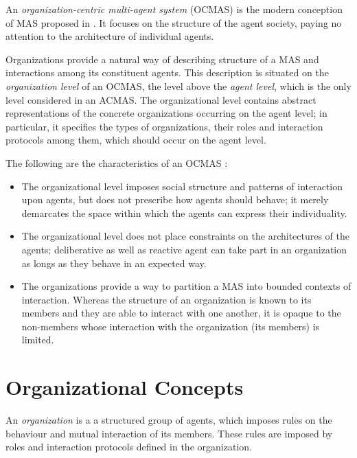 An \textit{organization-centric multi-agent system} (OCMAS) is the modern conception of MAS proposed in \cite{Ferber03}.
It focuses on the structure of the agent society, paying no attention to the architecture of individual agents.

Organizations provide a natural way of describing structure of a MAS and interactions among its constituent agents.
This description is situated on the \textit{organization level} of an OCMAS, the level above the \textit{agent level}, which is the only level considered in an ACMAS.
The organizational level contains abstract representations of the concrete organizations occurring on the agent level; in particular, it specifies the types of organizations, their roles and interaction protocols among them, which should occur on the agent level.

The following are the characteristics of an OCMAS \cite{Ferber03}:
\begin{itemize}
	\item The organizational level imposes social structure and patterns of interaction upon agents, but does not prescribe how agents should behave; it merely demarcates the space within which the agents can express their individuality.
	\item The organizational level does not place constraints on the architectures of the agents; deliberative as well as reactive agent can take part in an organization as longs as they behave in an expected way.
	\item The organizations provide a way to partition a MAS into bounded contexts of interaction.
	Whereas the structure of an organization is known to its members and they are able to interact with one another, it is opaque to the non-members whose interaction with the organization (its members) is limited.
\end{itemize}

\section{Organizational Concepts}

An \textit{organization} is a a structured group of agents, which imposes rules on the behaviour and mutual interaction of its members. 
These rules are imposed by roles and interaction protocols defined in the organization.

